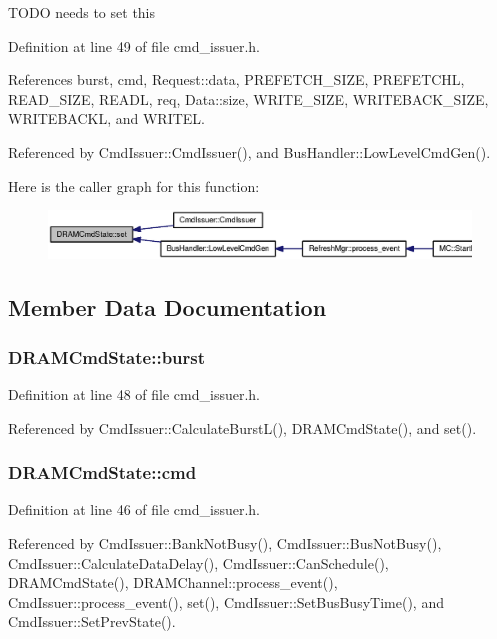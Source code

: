 TODO needs to set this 

Definition at line 49 of file cmd\_\-issuer.h.

References burst, cmd, Request::data, PREFETCH\_\-SIZE, PREFETCHL, READ\_\-SIZE, READL, req, Data::size, WRITE\_\-SIZE, WRITEBACK\_\-SIZE, WRITEBACKL, and WRITEL.

Referenced by CmdIssuer::CmdIssuer(), and BusHandler::LowLevelCmdGen().

Here is the caller graph for this function:\nopagebreak
\begin{figure}[H]
\begin{center}
\leavevmode
\includegraphics[width=401pt]{structDRAMCmdState_901fee4ee232a13830c3705ab9c514cc_icgraph}
\end{center}
\end{figure}


\subsection{Member Data Documentation}
\subsubsection[{burst}]{ {\bf DRAMCmdState::burst}}\label{structDRAMCmdState_8b364745bf88499975f408a3d48293ff}




Definition at line 48 of file cmd\_\-issuer.h.

Referenced by CmdIssuer::CalculateBurstL(), DRAMCmdState(), and set().
\subsubsection[{cmd}]{ {\bf DRAMCmdState::cmd}}\label{structDRAMCmdState_29d74daa51471e7181215b381e013e9e}




Definition at line 46 of file cmd\_\-issuer.h.

Referenced by CmdIssuer::BankNotBusy(), CmdIssuer::BusNotBusy(), CmdIssuer::CalculateDataDelay(), CmdIssuer::CanSchedule(), DRAMCmdState(), DRAMChannel::process\_\-event(), CmdIssuer::process\_\-event(), set(), CmdIssuer::SetBusBusyTime(), and CmdIssuer::SetPrevState().
